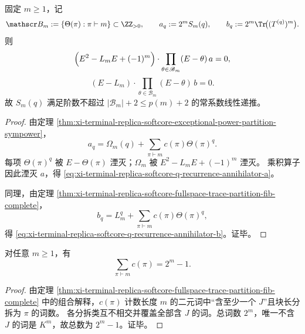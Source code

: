 \begin{theorem}\label{thm:xi-terminal-replica-softcore-q-recurrence-partition-annihilator}
固定 \(m\ge 1\)，记
\[
\mathscr B_m:=\{\Theta(\pi):\pi\vdash m\}\subset\ZZ_{>0},\qquad
a_q:=2^m S_m(q),\qquad b_q:=2^m\Tr\!\bigl((T^{(q)})^m\bigr).
\]
则
\begin{equation}\label{eq:xi-terminal-replica-softcore-q-recurrence-annihilator-a}
\Bigl(E^2-L_mE+(-1)^m\Bigr)\cdot\prod_{\theta\in\mathscr B_m}(E-\theta)\,a=0,
\end{equation}
\begin{equation}\label{eq:xi-terminal-replica-softcore-q-recurrence-annihilator-b}
(E-L_m)\cdot\prod_{\theta\in\mathscr B_m}(E-\theta)\,b=0.
\end{equation}
故 \(S_m(q)\) 满足阶数不超过 \(|\mathscr B_m|+2\le p(m)+2\) 的常系数线性递推。
\end{theorem}
\begin{proof}
由定理 \ref{thm:xi-terminal-replica-softcore-exceptional-power-partition-sympower}，
\[
a_q=\Omega_m(q)+\sum_{\pi\vdash m}c(\pi)\Theta(\pi)^q.
\]
每项 \(\Theta(\pi)^q\) 被 \(E-\Theta(\pi)\) 湮灭；\(\Omega_m\) 被
\(
E^2-L_mE+(-1)^m
\)
湮灭。
乘积算子因此湮灭 \(a\)，得 \eqref{eq:xi-terminal-replica-softcore-q-recurrence-annihilator-a}。

同理，由定理 \ref{thm:xi-terminal-replica-softcore-fullspace-trace-partition-fib-complete}，
\[
b_q=L_m^q+\sum_{\pi\vdash m}c(\pi)\Theta(\pi)^q,
\]
得 \eqref{eq:xi-terminal-replica-softcore-q-recurrence-annihilator-b}。证毕。
\end{proof}

\begin{corollary}[分拆系数总和恒等式]\label{cor:xi-terminal-replica-softcore-partition-coeff-sum-2m-minus-1}
对任意 \(m\ge 1\)，有
\begin{equation}\label{eq:xi-terminal-replica-softcore-partition-coeff-sum}
\sum_{\pi\vdash m}c(\pi)=2^m-1.
\end{equation}
\end{corollary}
\begin{proof}
由定理 \ref{thm:xi-terminal-replica-softcore-fullspace-trace-partition-fib-complete} 中的组合解释，\(c(\pi)\) 计数长度 \(m\) 的二元词中“含至少一个 \(J\)”且块长分拆为 \(\pi\) 的词数。
各分拆类互不相交并覆盖全部含 \(J\) 的词。总词数 \(2^m\)，唯一不含 \(J\) 的词是 \(K^m\)，故总数为 \(2^m-1\)。证毕。
\end{proof}

\endinput
